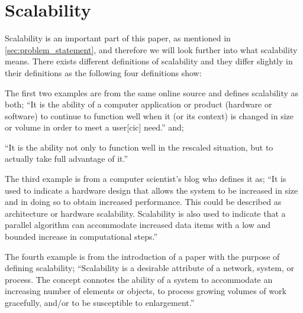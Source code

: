 \section{Scalability}\label{sec:scalability}
Scalability is an important part of this paper, as mentioned in \cref{sec:problem_statement}, and therefore we will look further into what scalability means.
There exists different definitions of scalability and they differ slightly in their definitions as the following four definitions show:

The first two examples are from the same online source and defines scalability as both;
``It is the ability of a computer application or product (hardware or software) to continue to function well when it (or its context) is changed in size or volume in order to meet a user[cic] need.''
and;

``It is the ability not only to function well in the rescaled situation, but to actually take full advantage of it.''
\cite{scaleDef1}

The third example is from a computer scientist's blog who defines it as;
``It is used to indicate a hardware design that allows the system to be increased in size and in doing so to obtain increased performance. This could be described as architecture or hardware scalability. Scalability is also used to indicate that a parallel algorithm can accommodate increased data items with a low and bounded increase in computational steps.''
\cite{scaleDef2}

The fourth example is from the introduction of a paper with the purpose of defining scalability;
``Scalability is a desirable attribute of a network, system, or
process. The concept connotes the ability of a system to
accommodate an increasing number of elements or objects, to
process growing volumes of work gracefully, and/or to be
susceptible to enlargement.''
\cite{scaleDef3}

